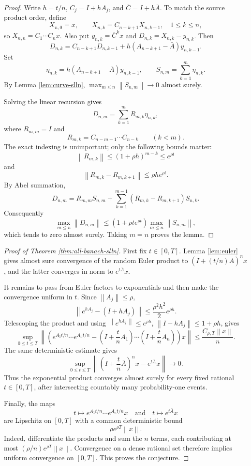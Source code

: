 \documentclass[11pt]{article}
\newcommand{\norm}[1]{\left\lVert #1\right\rVert}
\begin{document}
\begin{proof}
Write \(h=t/n\), \(C_j=I+hA_j\), and \(\bar C=I+h\bar A\).  To match the
source product order, define
\[
  X_{n,0}=x,\qquad
  X_{n,k}=C_{n-k+1}X_{n,k-1},\quad 1\le k\le n,
\]
so \(X_{n,n}=C_1\cdots C_nx\).  Also put \(y_{n,k}=\bar C^kx\) and
\(D_{n,k}=X_{n,k}-y_{n,k}\).  Then
\[
  D_{n,k}=C_{n-k+1}D_{n,k-1}
  +h(A_{n-k+1}-\bar A)y_{n,k-1}.
\]
Set
\[
  \eta_{n,k}=h(A_{n-k+1}-\bar A)y_{n,k-1},
  \qquad
  S_{n,m}=\sum_{k=1}^{m}\eta_{n,k}.
\]
By Lemma \ref{lem:curve-slln},
\(\max_{m\le n}\norm{S_{n,m}}\to0\) almost surely.

Solving the linear recursion gives
\[
  D_{n,m}=\sum_{k=1}^{m}R_{m,k}\eta_{n,k},
\]
where \(R_{m,m}=I\) and
\[
  R_{m,k}=C_{n-m+1}\cdots C_{n-k}
  \qquad (k<m).
\]
The exact indexing is unimportant; only the following bounds matter:
\[
  \norm{R_{m,k}}\le (1+\rho h)^{m-k}\le e^{\rho t}
\]
and
\[
  \norm{R_{m,k}-R_{m,k+1}}
  \le \rho h e^{\rho t}.
\]
By Abel summation,
\[
  D_{n,m}
  =
  R_{m,m}S_{n,m}
  +\sum_{k=1}^{m-1}(R_{m,k}-R_{m,k+1})S_{n,k}.
\]
Consequently
\[
  \max_{m\le n}\norm{D_{n,m}}
  \le
  \left(1+\rho t e^{\rho t}\right)
  \max_{m\le n}\norm{S_{n,m}},
\]
which tends to zero almost surely.  Taking \(m=n\) proves the lemma.
\end{proof}

\begin{proof}[Proof of Theorem \ref{thm:all-banach-slln}]
First fix \(t\in[0,T]\).  Lemma \ref{lem:euler} gives almost sure convergence
of the random Euler product to \((I+(t/n)\bar A)^nx\), and the latter
converges in norm to \(e^{t\bar A}x\).

It remains to pass from Euler factors to exponentials and then make the
convergence uniform in \(t\).  Since \(\norm{A_j}\le\rho\),
\[
  \norm{e^{hA_j}-(I+hA_j)}
  \le \frac{\rho^2h^2}{2}e^{\rho h}.
\]
Telescoping the product and using
\(\norm{e^{hA_j}}\le e^{\rho h}\), \(\norm{I+hA_j}\le 1+\rho h\), gives
\[
  \sup_{0\le t\le T}
  \norm{
    \left(e^{A_1t/n}\cdots e^{A_nt/n}
    -
    \left(I+\frac tn A_1\right)\cdots
    \left(I+\frac tn A_n\right)\right)x}
  \le \frac{C_{\rho,T}\norm{x}}{n}.
\]
The same deterministic estimate gives
\[
  \sup_{0\le t\le T}
  \norm{\left(I+\frac tn\bar A\right)^nx-e^{t\bar A}x}\to0 .
\]
Thus the exponential product converges almost surely for every fixed rational
\(t\in[0,T]\), after intersecting countably many probability-one events.

Finally, the maps
\[
  t\mapsto e^{A_1t/n}\cdots e^{A_nt/n}x
  \quad\text{and}\quad
  t\mapsto e^{t\bar A}x
\]
are Lipschitz on \([0,T]\) with a common deterministic bound
\[
  \rho e^{\rho T}\norm{x}.
\]
Indeed, differentiate the products and sum the \(n\) terms, each contributing
at most \((\rho/n)e^{\rho T}\norm{x}\).  Convergence on a dense rational set
therefore implies uniform convergence on \([0,T]\).  This proves the
conjecture.
\end{proof}
\end{document}
